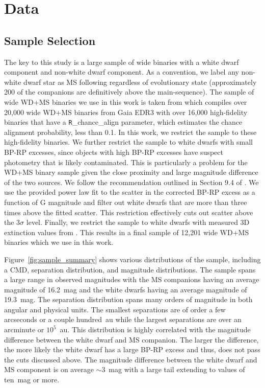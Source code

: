\documentclass[twocolumn,linenumbers]{aastex631}
\begin{document}
\section{Data}\label{sec:data}
\subsection{Sample Selection}

The key to this study is a large sample of wide binaries with a white dwarf component and non-white dwarf component. As a convention, we label any non-white dwarf star as MS following \cite{2021MNRAS.506.2269E} regardless of evolutionary state (approximately 200 of the companions are definitively above the main-sequence). The sample of wide WD+MS binaries we use in this work is taken from \cite{2021MNRAS.506.2269E} which compiles over 20,000 wide WD+MS binaries from Gaia EDR3 with over 16,000 high-fidelity binaries that have a {\texttt R\_chance\_align} parameter, which estimates the chance alignment probability, less than 0.1. In this work, we restrict the sample to these high-fidelity binaries. We further restrict the sample to white dwarfs with small BP-RP excesses, since objects with high BP-RP excesses have suspect photometry that is likely contaminated. This is particularly a problem for the WD+MS binary sample given the close proximity and large magnitude difference of the two sources. We follow the recommendation outlined in Section 9.4 of \cite{2021A&A...649A...3R}. We use the provided power law fit to the scatter in the corrected BP-RP excess as a function of G magnitude and filter out white dwarfs that are more than three times above the fitted scatter. This restriction effectively cuts out scatter above the $3\sigma$ level. Finally, we restrict the sample to white dwarfs with measured 3D extinction values from \cite{2021MNRAS.508.3877G}. This results in a final sample of 12,201 wide WD+MS binaries which we use in this work.

Figure~\ref{fig:sample_summary} shows various distributions of the sample, including a CMD, separation distribution, and magnitude distributions. The sample spans a large range in observed magnitudes with the MS companions having an average magnitude of 16.2~mag and the white dwarfs having an average magnitude of 19.3~mag. The separation distribution spans many orders of magnitude in both angular and physical units. The smallest separations are of order a few arcseconds or a couple hundred~au while the largest separations are over an arcminute or $10^5$~au. This distribution is highly correlated with the magnitude difference between the white dwarf and MS companion. The larger the difference, the more likely the white dwarf has a large BP-RP excess and thus, does not pass the cuts discussed above. The magnitude difference between the white dwarf and MS component is on average $\sim{3}$~mag with a large tail extending to values of ten~mag or more.
\end{document}
